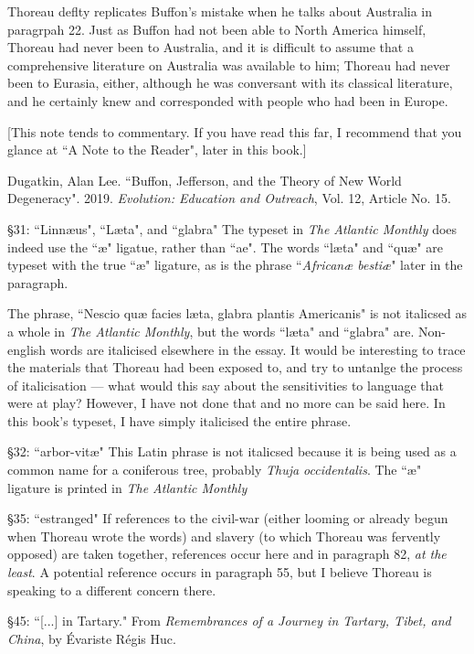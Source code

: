 \documentclass[twoside,openright,10pt]{memoir} %
\begin{document}
Thoreau deflty replicates Buffon's mistake when he talks about Australia in paragrpah 22. Just as Buffon had not been able to North America himself, Thoreau had never been to Australia, and it is difficult to assume that a comprehensive literature on Australia was available to him; Thoreau had never been to Eurasia, either, although he was conversant with its classical literature, and he certainly knew and corresponded with people who had been in Europe.

[This note tends to commentary. If you have read this far, I recommend that you glance at “A Note to the Reader", later in this book.]

\small Dugatkin, Alan Lee. “Buffon, Jefferson, and the Theory of New World Degeneracy". 2019. \emph{Evolution: Education and Outreach}, Vol. 12, Article No. 15. \normalsize

§31: “Linnæus", “Læta", and “glabra"\newline
The typeset in \emph{The Atlantic Monthly} does indeed use the “æ" ligatue, rather than “ae". The words “læta" and “quæ" are typeset with the true “æ" ligature, as is the phrase “\emph{Africanæ bestiæ}" later in the paragraph.

The phrase, “Nescio quæ facies læta, glabra plantis Americanis" is not italicsed as a whole in \emph{The Atlantic Monthly}, but the words “læta" and “glabra" are. Non-english words are italicised elsewhere in the essay. It would be interesting to trace the materials that Thoreau had been exposed to, and try to untanlge the process of italicisation — what would this say about the sensitivities to language that were at play? However, I have not done that and no more can be said here. In this book's typeset, I have simply italicised the entire phrase.

§32: “arbor-vitæ"\newline
This Latin phrase is not italicsed because it is being used as a common name for a coniferous tree, probably \emph{Thuja occidentalis}. The “æ" ligature is printed in \emph{The Atlantic Monthly}

§35: “estranged"\newline
If references to the civil-war (either looming or already begun when Thoreau wrote the words) and slavery (to which Thoreau was fervently opposed) are taken together, references occur here and in paragraph 82, \emph{at the least}. A potential reference occurs in paragraph 55, but I believe Thoreau is speaking to a different concern there.

§45: “[...] in Tartary."\newline
From \emph{Remembrances of a Journey in Tartary, Tibet, and China}, by Évariste Régis Huc.
\end{document}
